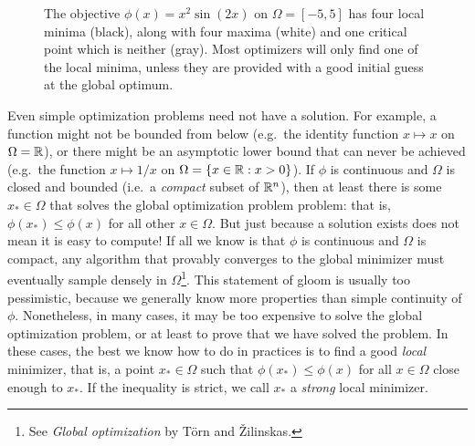 \documentclass[12pt, leqno]{article} %
\begin{document}
\begin{figure}
  \begin{center}
  \caption{The objective $\phi(x) = x^2 \sin(2x)$ on $\Omega = [-5,5]$
    has four local minima (black), along with four maxima (white) and
    one critical point which is neither (gray).  Most optimizers will
    only find one of the local minima, unless they are provided with
    a good initial guess at the global optimum.}
  \end{center}
\end{figure}

Even simple optimization problems need not have a solution.
For example, a function might not be bounded from below (e.g.~the
identity function $x \mapsto x$ on $\Omega = \mathbb{R}$), or there might
be an asymptotic lower bound that can never be achieved (e.g.~the
function $x \mapsto 1/x$ on $\Omega = \{ x \in \mathbb{R} : x > 0 \}$).
If $\phi$ is continuous and $\Omega$ is closed and bounded (i.e.~a
{\em compact} subset of $\mathbb{R}^n$), then at least there is some
$x_* \in \Omega$ that solves the global optimization problem problem:
that is, $\phi(x_*) \leq \phi(x)$ for all other $x \in \Omega$.
But just because a solution exists does not mean it is easy to
compute!  If all we know is that $\phi$ is continuous and $\Omega$ is
compact, any algorithm that provably converges to the global minimizer
must eventually sample densely in $\Omega$\footnote{%
  See {\em Global optimization} by T{\"o}rn and {\v{Z}}ilinskas.
}.  This statement of gloom
is usually too pessimistic, because we generally know more properties
than simple continuity of $\phi$.  Nonetheless, in many cases,
it may be too expensive to solve the global optimization
problem, or at least to prove that we have solved the problem.
In these cases, the best we know how to do in practices is to find a
good {\em local} minimizer, that is, a point $x_* \in \Omega$ such that
$\phi(x_*) \leq \phi(x)$ for all $x \in \Omega$ close enough to $x_*$.
If the inequality is strict, we call $x_*$ a {\em strong} local
minimizer.
\end{document}
